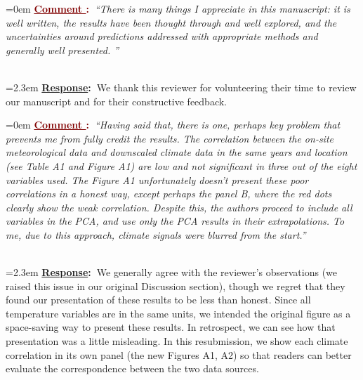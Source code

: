 \documentclass[12pt]{article}
\newcounter{cN}
\newcommand{\comment}[1]{
	\vspace{2em}
	\refstepcounter{cN} %
	\noindent \hangindent=0em \textbf{\textcolor{Maroon}{\uline{Comment \thecN}:~}}\emph{``#1''}
	}
\newcommand{\response}[1]{
	\\[0.25em]
	\hangindent=2.3em \textbf{\textcolor{NavyBlue}{\uline{Response}:~}}#1
	}
\begin{document}
\comment{There is many things I appreciate in this manuscript: it is well written, the results have been thought through and well explored, and the uncertainties around predictions addressed with appropriate methods and generally well presented. }
\response{We thank this reviewer for volunteering their time to review our manuscript and for their constructive feedback.}

\comment{Having said that, there is one, perhaps key problem that prevents me from fully credit the results. 
The correlation between the on-site meteorological data and downscaled climate data in the same years and location (see Table A1 and Figure A1) are low and not significant in three out of the eight variables used. 
The Figure A1 unfortunately doesn't present these poor correlations in a honest way, except perhaps the panel B, where the red dots clearly show the weak correlation. Despite this, the authors proceed to include all variables in the PCA, and use only the PCA results in their extrapolations. 
To me, due to this approach, climate signals were blurred from the start.}
\response{We generally agree with the reviewer's observations (we raised this issue in our original Discussion section), though we regret that they found our presentation of these results to be less than honest.
Since all temperature variables are in the same units, we intended the original figure as a space-saving way to present these results.
In retrospect, we can see how that presentation was a little misleading. 
In this resubmission, we show each climate correlation in its own panel (the new Figures A1, A2) so that readers can better evaluate the correspondence between the two data sources. 
}
\end{document}
